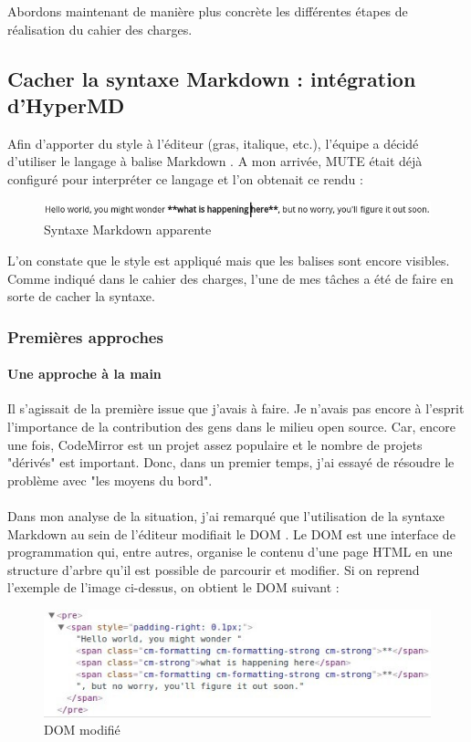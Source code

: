 \documentclass[12pt]{article}
\begin{document}
\newpage
Abordons maintenant de manière plus concrète les différentes étapes de réalisation du cahier des charges.\\

\subsection{Cacher la syntaxe Markdown : intégration d'HyperMD}
Afin d'apporter du style à l'éditeur (gras, italique, etc.), l'équipe a décidé d'utiliser le langage à balise Markdown \cite{markdown}. A mon arrivée, MUTE était déjà configuré pour interpréter ce langage et l'on obtenait ce rendu :

\begin{figure}[H]
    \centering
    \includegraphics[scale=0.65]{gallery/style_example.jpg}
    \caption[nom dans le sommaire]{Syntaxe Markdown apparente}
    \label{fig:gallery3}
\end{figure}

L'on constate que le style est appliqué mais que les balises sont encore visibles. Comme indiqué dans le cahier des charges, l'une de mes tâches a été de faire en sorte de cacher la syntaxe.

\subsubsection{Premières approches}
\paragraph{Une approche à la main}
Il s'agissait de la première issue que j'avais à faire. Je n'avais pas encore à l'esprit l'importance de la contribution des gens dans le milieu open source. Car, encore une fois, CodeMirror est un projet assez populaire et le nombre de projets "dérivés" est important. Donc, dans un premier temps, j'ai essayé de résoudre le problème avec "les moyens du bord".\\
\paragraph{}
Dans mon analyse de la situation, j'ai remarqué que l'utilisation de la syntaxe Markdown au sein de l'éditeur modifiait le DOM \cite{dom}. Le DOM est une interface de programmation qui, entre autres, organise le contenu d'une page HTML en une structure d'arbre qu'il est possible de parcourir et modifier. Si on reprend l'exemple de l'image ci-dessus, on obtient le DOM suivant :
\begin{figure}[H]
    \centering
    \includegraphics[scale=0.95]{gallery/modified_dom.jpg}
    \caption[nom dans le sommaire]{DOM modifié}
    \label{fig:gallery4}
\end{figure}
\end{document}
